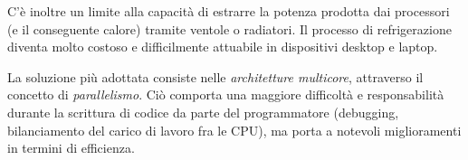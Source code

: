\documentclass[class=book, crop=false, oneside]{standalone}
\begin{document}
C'è inoltre un limite alla capacità di estrarre la potenza prodotta dai processori (e il conseguente calore) tramite ventole o radiatori.
Il processo di refrigerazione diventa molto costoso e difficilmente attuabile in dispositivi desktop e laptop.

La soluzione più adottata consiste nelle \emph{architetture multicore}, attraverso il concetto di \emph{parallelismo}.
Ciò comporta una maggiore difficoltà e responsabilità durante la scrittura di codice da parte del programmatore (debugging, bilanciamento del carico di lavoro fra le CPU), ma porta a notevoli miglioramenti in termini di efficienza.
\end{document}
